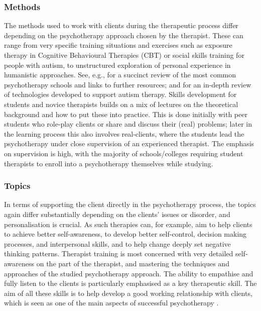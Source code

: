 \documentclass[prodmode,acmtochi]{acmsmall}
\newcommand{\todo}[1]{\textrm{\textrm{\textcolor{LightBlue}{[[#1]]}}}}
\begin{document}
\subsubsection*{Methods}  
The methods used to work with clients during the therapeutic process differ depending on the psychotherapy approach chosen by the therapist. These can range from very specific training situations and exercises such as exposure therapy in Cognitive Behavioural Therapies (CBT) or social skills training for people with autism, to unstructured exploration of personal experience in humanistic approaches.  See, e.g.,  for a succinct review of the most common psychotherapy schools and links to further resources; and \cite{Kientz2013} for an in-depth review of technologies developed to support autism therapy. 
%
Skills development for students and novice therapists builds on a mix of lectures on the theoretical background and how to put these into practice. This is done initially with peer students who role-play clients or share and discuss their (real) problems; later in the learning process this also involves real-clients, where the students lead the psychotherapy under close supervision of an experienced therapist. The emphasis on supervision is high, with the majority of schools/colleges requiring student therapists to enroll into a psychotherapy themselves while studying. 


\subsubsection*{Topics} 
In terms of supporting the client directly in the psychotherapy process, the topics again differ substantially depending on the clients' issues or disorder, and personalisation is crucial. As such therapies can, for example, aim to help clients to achieve better self-awareness, to develop better  self-control, decision making processes, and interpersonal skills, and to help change deeply set negative thinking patterns.  %
%
Therapist training is most concerned with very detailed self-awareness on the part of the therapist, and mastering the techniques and approaches of the studied psychotherapy approach. The ability to empathise and fully listen to the clients is particularly emphasised as a key therapeutic skill. The aim of all these skills is to help develop a good working relationship with clients, which is seen as one of the main aspects of successful psychotherapy \cite{Asay1999}.
\end{document}
